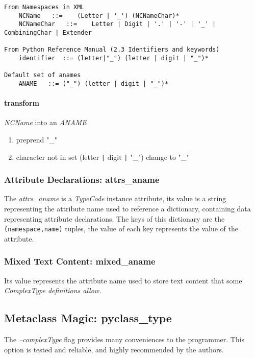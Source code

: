
\begin{verbatim}
From Namespaces in XML
	NCName	 ::=	(Letter | '_') (NCNameChar)*
	NCNameChar	 ::=	Letter | Digit | '.' | '-' | '_' | CombiningChar | Extender

From Python Reference Manual (2.3 Identifiers and keywords)
	identifier	::=	(letter|"_") (letter | digit | "_")*

Default set of anames
	ANAME	::=	("_") (letter | digit | "_")*
\end{verbatim}

\paragraph{transform} {\it NCName} into an {\it ANAME}
\begin{enumerate}
\item preprend "_"
\item character not in set (letter \verb!|! digit \verb!|! "_") change to "_"
\end{enumerate}
\par

\subsubsection{Attribute Declarations: attrs_aname}
The {\it attrs_aname} is a {\it TypeCode} instance attribute, its value is a string representing the
attribute name used to reference a dictionary, containing data representing 
attribute declarations.  The keys of this dictionary are the  
\verb!(namespace,name)! tuples, the value of each key represents the value of
the attribute.


\subsubsection{Mixed Text Content: mixed_aname}
Its value represents the attribute name used to store text content that some
\it{ComplexType} definitions allow.

\subsection{Metaclass Magic: pyclass_type}
\label{subsection:MM}
The {\it --complexType} flag provides many conveniences to the programmer. This 
option is tested and reliable, and highly recommended by the authors.

